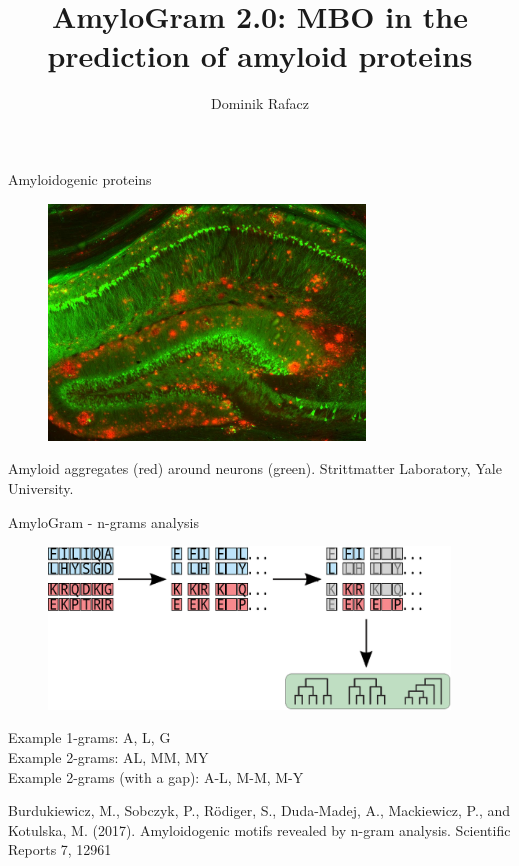 \documentclass{beamer}
\title{AmyloGram 2.0: MBO in the prediction of amyloid proteins}
\date{}
\author{Dominik Rafacz}
\institute{Warsaw University of Technology}
\begin{document}



\maketitle
\begin{frame}{Amyloidogenic proteins}
  \begin{figure} 
    \includegraphics[width=0.75\textwidth]{figures/amyloid_aggregates.jpg}
  \end{figure}
  
  \footnotesize
  Amyloid aggregates (red) around neurons (green). Strittmatter Laboratory, Yale University.
\end{frame}


\begin{frame}{AmyloGram - n-grams analysis}
  \begin{figure} 
    \includegraphics[width=0.95\textwidth]{figures/ngram1.eps}
  \end{figure}
  
  Example 1-grams: A, L, G \\
  Example 2-grams: AL, MM, MY \\
  Example 2-grams (with a gap): A-L, M-M, M-Y
  
  \begin{tiny}
    Burdukiewicz, M., Sobczyk, P., Rödiger, S., Duda-Madej, A., Mackiewicz, P., and Kotulska, M. (2017). Amyloidogenic motifs revealed by n-gram analysis. Scientific Reports 7, 12961 \\
  \end{tiny}
\end{frame} 
\end{document}
